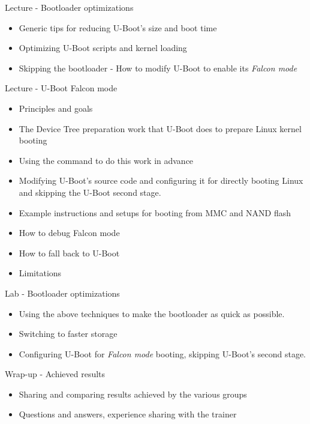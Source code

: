 \documentclass[a4paper,12pt,obeyspaces,spaces,hyphens]{article}
\begin{document}
\feagendatwocolumn
{Lecture - Bootloader optimizations}
{
  \begin{itemize}
  \item Generic tips for reducing U-Boot's size and boot time
  \item Optimizing U-Boot scripts and kernel loading
  \item Skipping the bootloader - How to modify U-Boot to
        enable its {\em Falcon mode}
  \end{itemize}
}
{Lecture - U-Boot Falcon mode}
{
  \begin{itemize}
  \item Principles and goals
  \item The Device Tree preparation work that U-Boot does to prepare Linux kernel booting
  \item Using the  command to do this work in advance
  \item Modifying U-Boot's source code and configuring it for directly
        booting Linux and skipping the U-Boot second stage.
  \item Example instructions and setups for booting from MMC and NAND flash
  \item How to debug Falcon mode
  \item How to fall back to U-Boot
  \item Limitations
  \end{itemize}
}

\feagendaonecolumn
{Lab - Bootloader optimizations}
{
 \begin{itemize}
 \item Using the above techniques to make the bootloader
       as quick as possible.
 \item Switching to faster storage
 \item Configuring U-Boot for {\em Falcon mode} booting,
       skipping U-Boot's second stage.
 \end{itemize}
}

\feagendaonecolumn
{Wrap-up - Achieved results}
{
 \begin{itemize}
 \item Sharing and comparing results achieved by the various groups
 \item Questions and answers, experience sharing with the trainer
 \end{itemize}
}
\end{document}
